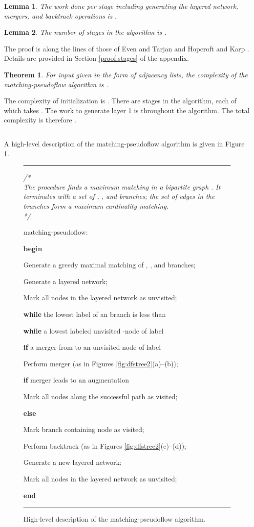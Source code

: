 \documentclass{article}
\newcounter{gap}
\newcommand{\n}{

\noindent \hspace{\thegap em}
}
\newcommand{\Procedure}{\noindent {\bf procedure }\addtocounter{gap}{2}}
\newcommand{\If}{{\bf if }}
\newcommand{\Begin}{{\bf begin}  \addtocounter{gap}{2}}
\newcommand{\Else}{{\bf else }}
\newcommand{\Do}{\addtocounter{gap}{2}{\bf do}}
\newcommand{\While}{{\bf while }}
\newcommand{\End}{{\bf end}}
\newcommand{\Comment}[1]{
{\it 
/*\\
\hspace{2em}#1\\
*/} \medskip
}
\newcommand{\EndLoop}{\addtocounter{gap}{-2}}
\newcommand{\algfigure}[4]{
\setcounter{gap}{0}
\renewcommand{\baselinestretch}{0.9}
\begin{figure}[#2]
\begin{center}
\rule{#1 \linewidth}{2.5pt}
\parbox{#1 \linewidth}{
\medskip
#3
\medskip
}
\rule{#1 \linewidth}{1.5pt}
\end{center}
\caption{#4}
\end{figure}
\renewcommand{\baselinestretch}{1.11111111111111111111111111111111}
}
\newtheorem{theorem}{Theorem}[section]
\newtheorem{lemma}{Lemma}[section]
\newenvironment{proof}[1][Proof:]{\begin{trivlist}
\item[\hskip \labelsep {\bfseries #1}]}{\end{trivlist}}
\newcommand{\qed}{\hfill \rule{2.5mm}{2.5mm}}
\begin{document}
\begin{lemma}
The work done per stage including generating the layered network, mergers, and backtrack operations is .
\end{lemma}

\begin{lemma}
\label{lem:stages}
The number of stages in the algorithm is .
\end{lemma}

The proof is along the lines of those of Even and Tarjan \cite{EveT75} and Hopcroft and Karp \cite{HopK73}.  Details are provided in Section \ref{proof:stages} of the appendix.

\begin{theorem}
For input given in the form of adjacency lists, the complexity of the {\sf matching-pseudoflow} algorithm is .
\end{theorem}

\begin{proof}
The complexity of initialization is . There are  stages in the algorithm, each of which takes . The work to generate layer 1 is  throughout the algorithm. The total complexity is therefore . \qed
\end{proof}

\noindent A high-level description of the {\sf matching-pseudoflow} algorithm is given in Figure \ref{algFigure:matchingPseudoflow}.

\algfigure{0.9}{htb}{ \Comment{The procedure finds a maximum matching in a bipartite graph . It terminates with a set of , , and  branches; the set of edges in the  branches form a maximum cardinality matching.}\n
\Procedure matching-pseudoflow: \n
    \Begin \n
    Generate a greedy maximal matching of , , and  branches; \n
    Generate a layered network; \n
    Mark all nodes in the layered network as unvisited; \n
    \While the lowest label of an  branch is less than  \Do \n
        \While  a lowest labeled unvisited -node  of label  \Do \n
            \If  a merger from  to an unvisited node of label - \Do \n
                Perform merger (as in Figures \ref{fig:dfstree2}(a)--(b)); \n
                \If merger leads to an augmentation \Do \n
                    Mark all nodes along the successful path as visited; \EndLoop \EndLoop \n
            \Else \Do \n
                Mark branch containing node  as visited; \n
                Perform backtrack (as in Figures \ref{fig:dfstree2}(c)--(d)); \EndLoop \EndLoop \n
        Generate a new layered network; \n
        Mark all nodes in the layered network as unvisited; \EndLoop \EndLoop \n
    \End \EndLoop
}{\label{algFigure:matchingPseudoflow}High-level description of the {\sf matching-pseudoflow} algorithm.}
\end{document}
